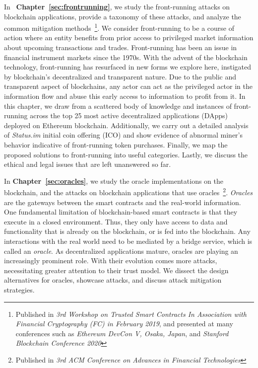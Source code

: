 In ~\textbf{Chapter~\ref{sec:frontrunning}}, we study the front-running attacks on blockchain applications, provide a taxonomy of these attacks, and analyze the common mitigation methods~\cite{eskandari2019sok}\footnote{Published in \textit{3rd Workshop on Trusted Smart Contracts In Association with Financial Cryptography (FC) in February 2019}, and presented at many conferences such as \textit{Ethereum DevCon V, Osaka, Japan}, and \textit{Stanford Blockchain Conference 2020}}. We consider front-running to be a course of action where an entity benefits from prior access to privileged market information about upcoming transactions and trades. Front-running has been an issue in financial instrument markets since the 1970s. With the advent of the blockchain technology, front-running has resurfaced in new forms we explore here, instigated by blockchain’s decentralized and transparent nature. Due to the public and transparent aspect of blockchains, any actor can act as the privileged actor in the information flow and abuse this early access to information to profit from it. In this chapter, we draw from a scattered body of knowledge and instances of front-running across the top 25 most active decentralized applications (DApps) deployed on Ethereum blockchain. Additionally, we carry out a detailed analysis of \textit{Status.im} initial coin offering (ICO) and show evidence of abnormal miner’s behavior indicative of front-running token purchases. Finally, we map the proposed solutions to front-running into useful categories. Lastly, we discuss the ethical and legal issues that are left unanswered so far.


In \textbf{Chapter~\ref{sec:oracles}}, we study the oracle implementations on the blockchain, and the attacks on blockchain applications that use oracles~\cite{eskandari2021sok}\footnote{Published in \textit{3rd ACM Conference on Advances in Financial Technologies}}. \textit{Oracles} are the gateways between the smart contracts and the real-world information. One fundamental limitation of blockchain-based smart contracts is that they execute in a closed environment. Thus, they only have access to data and functionality that is already on the blockchain, or is fed into the blockchain. Any interactions with the real world need to be mediated by a bridge service, which is called an \textit{oracle}. As decentralized applications mature, oracles are playing an increasingly prominent role. With their evolution comes more attacks, necessitating greater attention to their trust model. We dissect the design alternatives for oracles, showcase attacks, and discuss attack mitigation strategies.


